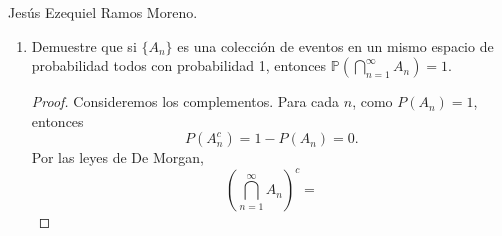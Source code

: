 \documentclass{article}
\newcommand{\ntarea}{1}
\begin{document}
\pagestyle{fancy}
\rhead{Tarea \ntarea}

\large{Jesús Ezequiel Ramos Moreno.}
\begin{enumerate}
    \item[2.] Demuestre que si \(\{A_n\}\) es una colección de eventos en un mismo espacio de probabilidad todos con probabilidad 1, entonces \(\mathbb{P}(\bigcap_{n=1}^{\infty} A_n) = 1\).
    \begin{proof}
        Consideremos los complementos. Para cada \(n\), como \(P(A_n) = 1\), entonces
        \[
        P(A_n^c) = 1 - P(A_n) = 0.
        \]
        Por las leyes de De Morgan,
        \[
        {\left(\bigcap_{n = 1}^\infty A_n\right)}^c = 
        \]
    \end{proof}
\end{enumerate}
\end{document}
